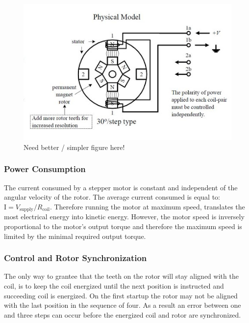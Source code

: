 \begin{figure}
	\centering
	\includegraphics[width=\textwidth]{pics/bipolar_stepper.png}
	\caption{Need better / simpler figure here!}
	\label{fig:bipolarstepper}
\end{figure}

\subsubsection{Power Consumption}
The current consumed by a stepper motor is constant and independent of the angular velocity of the rotor.
The average current consumed is equal to: $\textrm{I} = V_{\text{supply}}/R_{\text{coil}}$.
Therefore running the motor at maximum speed, translates the most electrical energy into kinetic energy.
However, the motor speed is inversely proportional to the motor's output torque and therefore the maximum speed is limited by the minimal required output torque.

\subsubsection{Control and Rotor Synchronization}

The only way to grantee that the teeth on the rotor will stay aligned with the coil, is to keep the coil energized until the next position is instructed and succeeding coil is energized. 
On the first startup the rotor may not be aligned with the last position in the sequence of four.
As a result an error between one and three steps can occur before the energized coil and rotor are synchronized.

